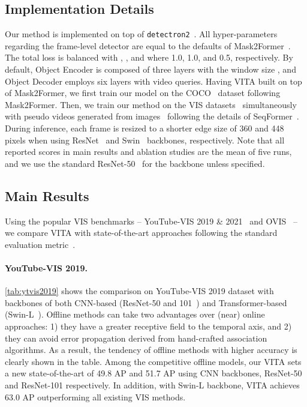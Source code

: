 \documentclass{article}
\begin{document}
\subsection{Implementation Details}
\label{sec:impl_details}
Our method is implemented on top of \texttt{detectron2}~\cite{Detectron2}.
All hyper-parameters regarding the frame-level detector are equal to the defaults of Mask2Former~\cite{Mask2Former}.
The total loss  is balanced with , , and  where 1.0, 1.0, and 0.5, respectively.
By default, Object Encoder is composed of three layers with the window size , and Object Decoder employs six layers with  video queries.
Having VITA built on top of Mask2Former, we first train our model on the COCO~\cite{COCO} dataset following Mask2Former.
Then, we train our method on the VIS datasets~\cite{MaskTrackRCNN, OVIS-Dataset} simultaneously with pseudo videos generated from images~\cite{COCO} following the details of SeqFormer~\cite{SeqFormer}.
During inference, each frame is resized to a shorter edge size of 360 and 448 pixels when using ResNet~\cite{ResNet} and Swin~\cite{Swin} backbones, respectively.
Note that all reported scores in main results and ablation studies are the mean of five runs, and we use the standard ResNet-50~\cite{ResNet} for the backbone unless specified.



\subsection{Main Results}
Using the popular VIS benchmarks -- YouTube-VIS 2019 \& 2021~\cite{MaskTrackRCNN} and OVIS~\cite{OVIS-Dataset} -- we compare VITA with state-of-the-art approaches following the standard evaluation metric~\cite{MaskTrackRCNN}.

\paragraph{YouTube-VIS 2019.}
\cref{tab:ytvis2019} shows the comparison on YouTube-VIS 2019 dataset with backbones of both CNN-based (ResNet-50 and 101~\cite{ResNet}) and Transformer-based (Swin-L~\cite{Swin}). Offline methods can take two advantages over (near) online approaches: 1) they have a greater receptive field to the temporal axis, and 2) they can avoid error propagation derived from hand-crafted association algorithms.
As a result, the tendency of offline methods with higher accuracy is clearly shown in the table.
Among the competitive offline models, our VITA sets a new state-of-the-art of 49.8 AP and 51.7 AP using CNN backbones, ResNet-50 and ResNet-101 respectively.
In addition, with Swin-L backbone, VITA achieves 63.0 AP outperforming all existing VIS methods.
\end{document}
